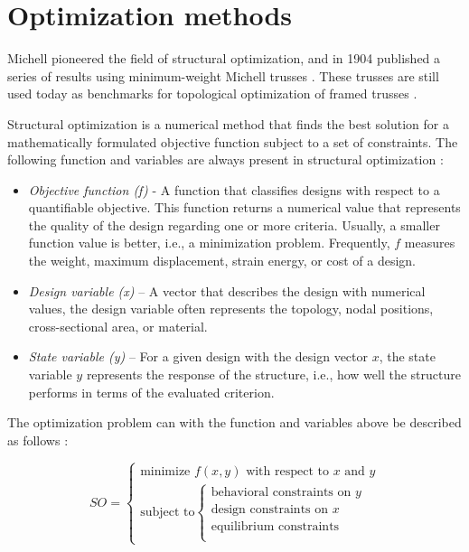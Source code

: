 \section{Optimization methods}
Michell pioneered the field of structural optimization, and in 1904 published a series of results using minimum-weight Michell trusses \cite{Michell1904}. These trusses are still used today as benchmarks for topological optimization of framed trusses \cite{Clune2013}. 

Structural optimization is a numerical method that finds the best solution for a mathematically formulated objective function subject to a set of constraints. The following function and variables are always present in structural optimization \cite{christensen2008introduction}:

\begin{itemize} 
\item \textit{Objective function (f) }- A function that classifies designs with respect to a quantifiable objective. This function returns a numerical value that represents the quality of the design regarding one or more criteria. Usually, a smaller function value is better, i.e., a minimization problem. Frequently, $f$ measures the weight, maximum displacement, strain energy, or cost of a design.
\item \textit{Design variable (x)} – A vector that describes the design with numerical values, the design variable often represents the topology, nodal positions, cross-sectional area, or material.
\item \textit{State variable (y)} – For a given design with the design vector $x$, the state variable $y$ represents the response of the structure, i.e., how well the structure performs in terms of the evaluated criterion.
\end{itemize} 

The optimization problem can with the function and variables above be described as follows \cite{christensen2008introduction}:

\begin{equation}
SO=\begin{cases}
    \textrm{minimize } f(x,y) \textrm{ with respect to } x \textrm{ and } y \\
    {\textrm{subject to} \begin{cases}
        \textrm{behavioral constraints on } y\\
        \textrm{design constraints on } x\\
	\textrm{equilibrium constraints} \\
    \end{cases}}
      \end{cases}
    \end{equation} 


